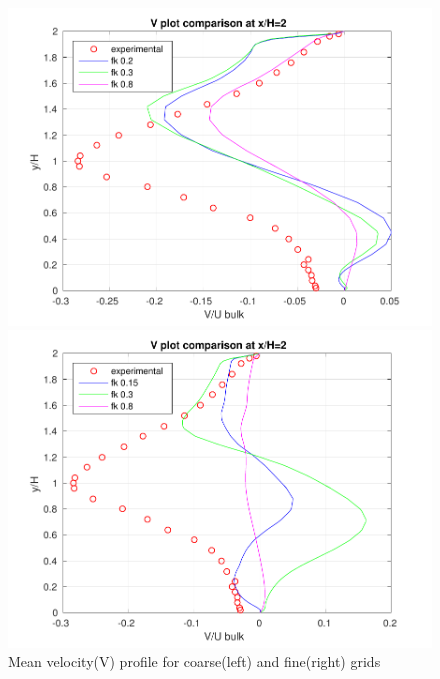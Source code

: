 \begin{figure}[H]
\begin{minipage}[b]{0.5\linewidth}
\includegraphics[scale=0.5]{figure/coarse/V_coarse_two.pdf}
\end{minipage}
\begin{minipage}[b]{0.5\linewidth}
\includegraphics[scale=0.5]{figure/fine/V_fine_two.pdf}
\end{minipage}
\caption{Mean velocity(V) profile for coarse(left) and fine(right) grids}
\label{fig:49}
\end{figure}


